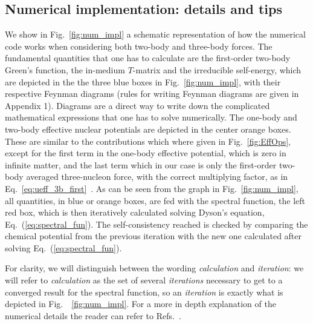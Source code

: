 \subsection{Numerical implementation: details and tips}
We show in Fig.~\ref{fig:num_impl} a schematic representation of how the numerical code works when considering both two-body and three-body forces. %
The fundamental quantities that one has to calculate are the first-order two-body Green's function, the in-medium $T$-matrix and the irreducible self-energy, which are depicted in the the three blue boxes in Fig.~\ref{fig:num_impl}, with their respective Feynman diagrams (rules for writing Feynman diagrams are given in Appendix 1). Diagrams are a direct way to write down the complicated mathematical expressions that one has to solve numerically. The one-body and two-body effective nuclear potentials are depicted in the center orange boxes. These are similar to the contributions which where given in Fig.~\ref{fig:EffOps}, except for the first term in the one-body effective potential, which is zero in infinite matter, and the last term which in our case is only the first-order two-body averaged three-nucleon force, with the correct multiplying factor, as in Eq.~\eqref{eq:ueff_3b_first}~\cite{ch11_Carbone2013NM3nf,ch11_Carbone2014}. As can be seen from the graph in Fig.~\ref{fig:num_impl}, all quantities, in blue or orange boxes, are fed with the spectral function, the left red box, which is then iteratively calculated solving Dyson's equation, Eq.~(\ref{eq:spectral_fun}). The self-consistency reached is checked by comparing the chemical potential from the previous iteration with the new one calculated after solving Eq.~(\ref{eq:spectral_fun}).

For clarity, we will distinguish between the wording \emph{calculation} and \emph{iteration}: we will refer to \emph{calculation} as the set of several \emph{iterations} necessary to get to a converged result for the spectral function, so an \emph{iteration} is exactly what is depicted in Fig.~~\ref{fig:num_impl}. For a more in depth explanation of the numerical details the reader can refer to Refs.~\cite{ch11_Frick2004PhD,ch11_Rios2007PhD}.\\


